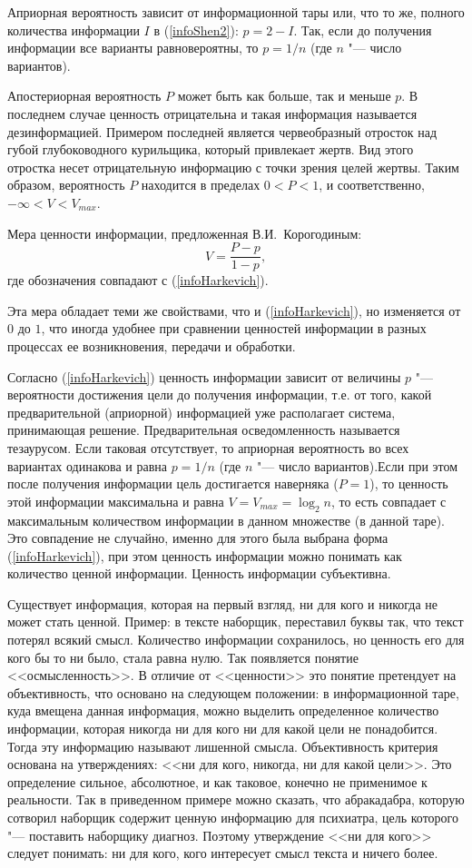 \documentclass[12pt,a4paper,oneside]{book}
\begin{document}
Априорная вероятность зависит от информационной тары или, что то же, полного количества информации $I$ в (\ref{infoShen2}): $p = 2 - I$. Так, если до получения информации все варианты равновероятны, то $p = 1/n$ (где $n$ "--- число вариантов).

Апостериорная вероятность $P$ может быть как больше, так и меньше $p$. В последнем случае ценность отрицательна и такая информация называется дезинформацией. Примером последней является червеобразный отросток над губой глубоководного курильщика, который привлекает жертв. Вид этого отростка несет отрицательную информацию с точки зрения целей жертвы. Таким образом, вероятность $P$ находится в пределах $0 < P < 1$, и соответственно, $ -\infty < V < V_{max}$.

Мера ценности информации, предложенная В.И.~Корогодиным:
\begin{equation}
\label{infoKorogod}
V = \frac{P - p}{1 - p},
\end{equation}
где обозначения совпадают с (\ref{infoHarkevich}).

Эта мера обладает теми же свойствами, что и (\ref{infoHarkevich}), но изменяется от $0$ до $1$, что иногда удобнее при сравнении ценностей информации в разных процессах ее возникновения, передачи и обработки.

Согласно (\ref{infoHarkevich}) ценность информации зависит от величины $p$ "--- вероятности достижения цели до получения информации, т.е. от того, какой предварительной (априорной) информацией уже располагает система, принимающая решение. Предварительная осведомленность называется тезаурусом. Если таковая отсутствует, то априорная вероятность во всех вариантах одинакова и равна $p = 1/n$ (где $n$ "--- число вариантов).Если при этом после получения информации цель достигается наверняка ($P = 1$), то ценность этой информации максимальна и равна $V = V_{max} = \log_2 n$, то есть совпадает с максимальным количеством информации в данном множестве (в данной таре). Это совпадение не случайно, именно для этого была выбрана форма (\ref{infoHarkevich}), при этом ценность информации можно понимать как количество ценной информации. Ценность информации субъективна.

Существует информация, которая на первый взгляд, ни для кого и никогда не может стать ценной. Пример: в тексте наборщик, переставил буквы так, что текст потерял всякий смысл. Количество информации сохранилось, но ценность его для кого бы то ни было, стала равна нулю. Так появляется понятие <<осмысленность>>. В отличие от <<ценности>> это понятие претендует на объективность, что основано на следующем положении: в информационной таре, куда вмещена данная информация, можно выделить определенное количество информации, которая никогда ни для кого ни для какой цели не понадобится. Тогда эту информацию называют лишенной смысла. Объективность критерия основана на утверждениях: <<ни для кого, никогда, ни для какой цели>>. Это определение сильное, абсолютное, и как таковое, конечно не применимое к реальности. Так в приведенном примере можно сказать, что абракадабра, которую сотворил наборщик содержит ценную информацию для психиатра, цель которого "--- поставить наборщику диагноз. Поэтому утверждение <<ни для кого>> следует понимать: ни для кого, кого интересует смысл текста и ничего более.
\end{document}
